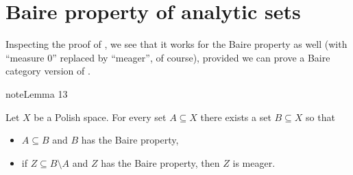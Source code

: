 \documentclass[letterpaper,10pt,english]{jupyterBook}
\begin{document}
\section{Baire property of analytic sets}
\label{\detokenize{regularityAnalytic:baire-property-of-analytic-sets}}
\sphinxAtStartPar
Inspecting the proof of {\hyperref[\detokenize{regularityAnalytic:prop-Souslin-Lebesgue}]{}}, we
see that it works for the Baire property as well (with “measure
\(0\)” replaced by “meager”, of course), provided we can
prove a Baire category version of {\hyperref[\detokenize{regularityAnalytic:lem-approx-measurable}]{}}.
\label{regularityAnalytic:lem-approx-category}
\begin{sphinxadmonition}{note}{Lemma 13}



\sphinxAtStartPar
Let \(X\) be a Polish space. For every set \(A \subseteq X\) there exists a set \(B \subseteq X\) so that
\begin{itemize}
\item {} 
\sphinxAtStartPar
{} \(A \subseteq B\) and \(B\)  has the Baire property,

\item {} 
\sphinxAtStartPar
{} if \(Z \subseteq B \setminus A\)  and \(Z\) has the Baire
property, then \(Z\) is meager.

\end{itemize}
\end{sphinxadmonition}
\end{document}
